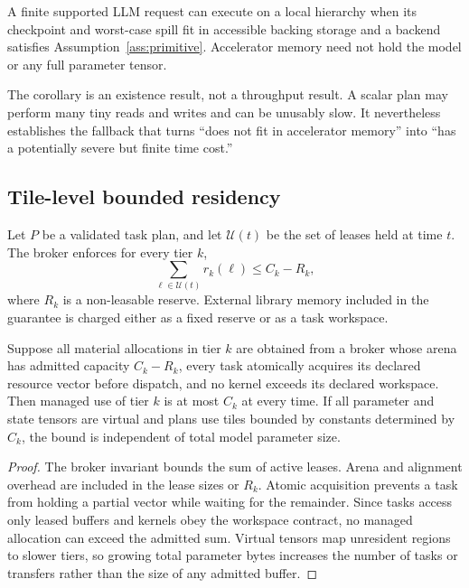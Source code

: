 \begin{corollary}
\label{cor:llm}
A finite supported LLM request can execute on a local hierarchy when its checkpoint and worst-case spill fit in accessible backing storage and a backend satisfies Assumption~\ref{ass:primitive}. Accelerator memory need not hold the model or any full parameter tensor.
\end{corollary}

The corollary is an existence result, not a throughput result. A scalar plan may perform many tiny reads and writes and can be unusably slow. It nevertheless establishes the fallback that turns ``does not fit in accelerator memory'' into ``has a potentially severe but finite time cost.''

\subsection{Tile-level bounded residency}

Let $P$ be a validated task plan, and let $\mathcal U(t)$ be the set of leases held at time $t$. The broker enforces for every tier $k$,
\[
  \sum_{\ell\in\mathcal U(t)} r_k(\ell) \le C_k-R_k,
\]
where $R_k$ is a non-leasable reserve. External library memory included in the guarantee is charged either as a fixed reserve or as a task workspace.

\begin{theorem}
\label{thm:memory-bound}
Suppose all material allocations in tier $k$ are obtained from a broker whose arena has admitted capacity $C_k-R_k$, every task atomically acquires its declared resource vector before dispatch, and no kernel exceeds its declared workspace. Then managed use of tier $k$ is at most $C_k$ at every time. If all parameter and state tensors are virtual and plans use tiles bounded by constants determined by $C_k$, the bound is independent of total model parameter size.
\end{theorem}

\begin{proof}
The broker invariant bounds the sum of active leases. Arena and alignment overhead are included in the lease sizes or $R_k$. Atomic acquisition prevents a task from holding a partial vector while waiting for the remainder. Since tasks access only leased buffers and kernels obey the workspace contract, no managed allocation can exceed the admitted sum. Virtual tensors map unresident regions to slower tiers, so growing total parameter bytes increases the number of tasks or transfers rather than the size of any admitted buffer.
\end{proof}

